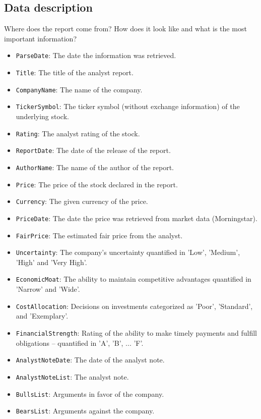 \documentclass[conference]{IEEEtran}
\begin{document}
\subsection{Data description}%
Where does the report come from? How does it look like and what is the most important information?
\begin{itemize}    
    \item \texttt{ParseDate}: The date the information was retrieved.
  \item \texttt{Title}: The title of the analyst report.
  \item \texttt{CompanyName}: The name of the company. 
  \item \texttt{TickerSymbol}: The ticker symbol (without exchange information) of the underlying stock.
  \item \texttt{Rating}: The analyst rating of the stock.
  \item \texttt{ReportDate}: The date of the release of the report. 
  \item \texttt{AuthorName}: The name of the author of the report. 
  \item \texttt{Price}: The price of the stock declared in the report.
  \item \texttt{Currency}: The given currency of the price. 
  \item \texttt{PriceDate}: The date the price was retrieved from market data (Morningstar).
  \item \texttt{FairPrice}: The estimated fair price from the analyst.
  \item \texttt{Uncertainty}: The company's uncertainty quantified in 'Low', 'Medium', 'High' and 'Very High'.
  \item \texttt{EconomicMoat}: The ability to maintain competitive advantages quantified in 'Narrow' and 'Wide'.
  \item \texttt{CostAllocation}:  Decisions on investments categorized as 'Poor', 'Standard', and 'Exemplary'.
  \item \texttt{FinancialStrength}: Rating of the ability to make timely payments and fulfill obligations -- quantified in 'A', 'B', ... 'F'.
  \item \texttt{AnalystNoteDate}: The date of the analyst note.
  \item \texttt{AnalystNoteList}: The analyst note.
  \item \texttt{BullsList}: Arguments in favor of the company.
  \item \texttt{BearsList}: Arguments against the company.

\end{itemize}
\end{document}
